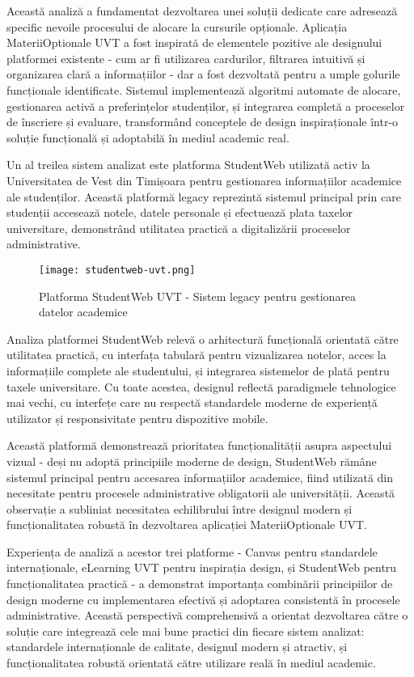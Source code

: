 \documentclass[12pt,a4paper]{report}
\begin{document}
Această analiză a fundamentat dezvoltarea unei soluții dedicate care adresează specific nevoile procesului de alocare la cursurile opționale. Aplicația MateriiOptionale UVT a fost inspirată de elementele pozitive ale designului platformei existente - cum ar fi utilizarea cardurilor, filtrarea intuitivă și organizarea clară a informațiilor - dar a fost dezvoltată pentru a umple golurile funcționale identificate. Sistemul implementează algoritmi automate de alocare, gestionarea activă a preferințelor studenților, și integrarea completă a proceselor de înscriere și evaluare, transformând conceptele de design inspiraționale într-o soluție funcțională și adoptabilă în mediul academic real.

Un al treilea sistem analizat este platforma StudentWeb utilizată activ la Universitatea de Vest din Timișoara pentru gestionarea informațiilor academice ale studenților. Această platformă legacy reprezintă sistemul principal prin care studenții accesează notele, datele personale și efectuează plata taxelor universitare, demonstrând utilitatea practică a digitalizării proceselor administrative.

\begin{figure}[H]
\centering
\texttt{[image: studentweb-uvt.png]}
\caption{Platforma StudentWeb UVT - Sistem legacy pentru gestionarea datelor academice}
\label{fig:studentweb-uvt}
\end{figure}

Analiza platformei StudentWeb relevă o arhitectură funcțională orientată către utilitatea practică, cu interfața tabulară pentru vizualizarea notelor, acces la informațiile complete ale studentului, și integrarea sistemelor de plată pentru taxele universitare. Cu toate acestea, designul reflectă paradigmele tehnologice mai vechi, cu interfețe care nu respectă standardele moderne de experiență utilizator și responsivitate pentru dispozitive mobile.

Această platformă demonstrează prioritatea funcționalității asupra aspectului vizual - deși nu adoptă principiile moderne de design, StudentWeb rămâne sistemul principal pentru accesarea informațiilor academice, fiind utilizată din necesitate pentru procesele administrative obligatorii ale universității. Această observație a subliniat necesitatea echilibrului între designul modern și funcționalitatea robustă în dezvoltarea aplicației MateriiOptionale UVT.

Experiența de analiză a acestor trei platforme - Canvas pentru standardele internaționale, eLearning UVT pentru inspirația design, și StudentWeb pentru funcționalitatea practică - a demonstrat importanța combinării principiilor de design moderne cu implementarea efectivă și adoptarea consistentă în procesele administrative. Această perspectivă comprehensivă a orientat dezvoltarea către o soluție care integrează cele mai bune practici din fiecare sistem analizat: standardele internaționale de calitate, designul modern și atractiv, și funcționalitatea robustă orientată către utilizare reală în mediul academic.
\end{document}
